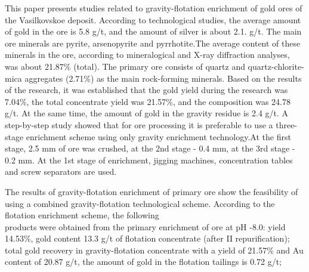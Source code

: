 This paper presents studies related to gravity-flotation enrichment of
gold ores of the Vasilkovskoe deposit. According to technological
studies, the average amount of gold in the ore is 5.8 g/t, and the
amount of silver is about 2.1. g/t. The main ore minerals are pyrite,
arsenopyrite and pyrrhotite.The average content of these minerals in the
ore, according to mineralogical and X-ray diffraction analyses, was
about 21.87\% (total). The primary ore consists of quartz and
quartz-chlorite-mica aggregates (2.71\%) as the main rock-forming
minerals. Based on the results of the research, it was established that
the gold yield during the research was 7.04\%, the total concentrate
yield was 21.57\%, and the composition was 24.78 g/t. At the same time,
the amount of gold in the gravity residue is 2.4 g/t. A step-by-step
study showed that for ore processing it is preferable to use a
three-stage enrichment scheme using only gravity enrichment
technology.At the first stage, 2.5 mm of ore was crushed, at the 2nd
stage - 0.4 mm, at the 3rd stage - 0.2 mm. At the 1st stage of
enrichment, jigging machines, concentration tables and screw separators
are used.

The results of gravity-flotation enrichment of primary ore show the
feasibility of using a combined gravity-flotation technological scheme.
According to the flotation enrichment scheme, the following \\products
were obtained from the primary enrichment of ore at pH -8.0: yield
14.53\%, gold content 13.3 g/t of flotation concentrate (after II
repurification); total gold recovery in gravity-flotation concentrate
with a yield of 21.57\% and Au content of 20.87 g/t, the amount of gold
in the flotation tailings is 0.72 g/t;

